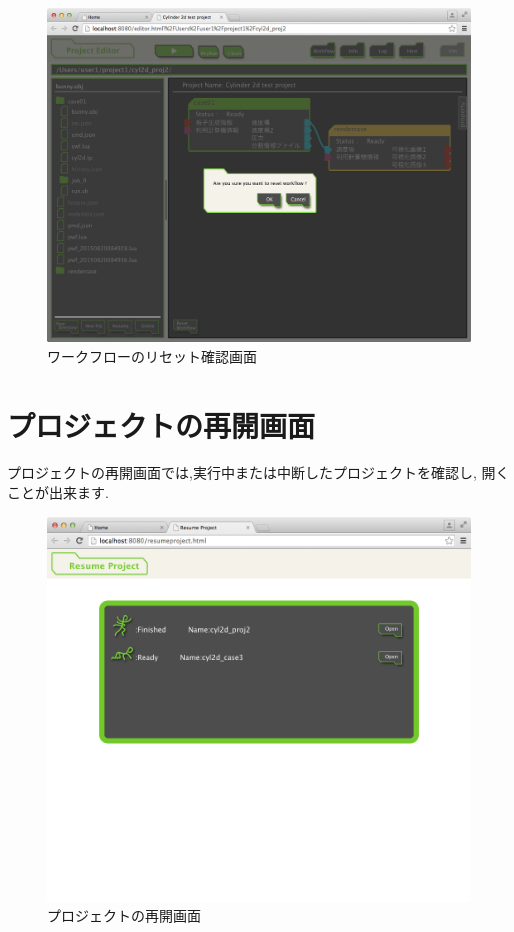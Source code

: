 \documentclass[a4paper,10pt,oneside]{jsbook}
\begin{document}
\begin{figure}[H]
	\begin{center}
		\includegraphics[width=12.0cm]{image/workflow_003.png}
	\end{center}
	\caption{ワークフローのリセット確認画面}
	\label{fig:workflow_003}
\end{figure}

\chapter{プロジェクトの再開画面}
\label{chap:resumeproject}
プロジェクトの再開画面では,実行中または中断したプロジェクトを確認し, 開くことが出来ます.

\begin{figure}[H]
	\begin{center}
		\includegraphics[width=12.0cm]{image/resumeproject_000.png}
	\end{center}
	\caption{プロジェクトの再開画面}
	\label{fig:resumeproject}
\end{figure}
\end{document}
